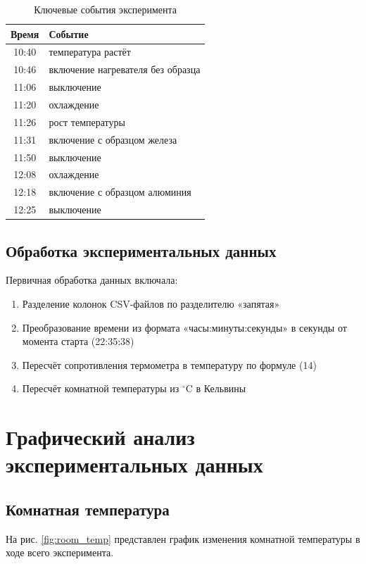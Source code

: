 \documentclass{article}
\begin{document}
\begin{table}[h!]
\centering
\caption{Ключевые события эксперимента}
\begin{tabular}{|c|l|}
\hline
Время & Событие \\
\hline
10:40 & температура растёт \\
10:46 & включение нагревателя без образца \\
11:06 & выключение \\
11:20 & охлаждение \\
11:26 & рост температуры \\
11:31 & включение с образцом железа \\
11:50 & выключение \\
12:08 & охлаждение \\
12:18 & включение с образцом алюминия \\
12:25 & выключение \\
\hline
\end{tabular}
\end{table}

\subsection*{Обработка экспериментальных данных}

Первичная обработка данных включала:
\begin{enumerate}
\item Разделение колонок CSV-файлов по разделителю «запятая»
\item Преобразование времени из формата «часы:минуты:секунды» в секунды от момента старта (22:35:38)
\item Пересчёт сопротивления термометра в температуру по формуле (14)
\item Пересчёт комнатной температуры из $^\circ$C в Кельвины
\end{enumerate}

\section*{Графический анализ экспериментальных данных}

\subsection*{Комнатная температура}

На рис. \ref{fig:room_temp} представлен график изменения комнатной температуры в ходе всего эксперимента.
\end{document}
